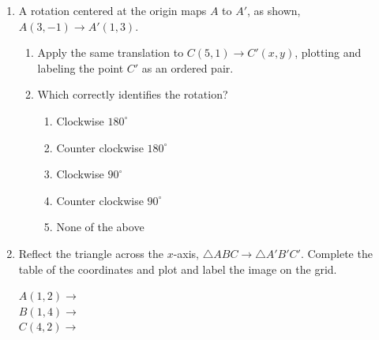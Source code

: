 \documentclass[12pt, twoside]{article}
\begin{document}
\begin{enumerate}
\newpage
\item A rotation centered at the origin maps $A$ to $A'$, as shown, $A(3,-1) \rightarrow A'(1,3)$.
\begin{multicols}{2}
  \begin{enumerate}
    \item Apply the same translation to $C(5,1)\rightarrow C'(x,y)$, plotting and labeling the point $C'$ as an ordered pair.
    \item Which correctly identifies the rotation?
    \begin{enumerate}[label=(\Alph*)]
      \item Clockwise $180^\circ$
      \item Counter clockwise $180^\circ$
      \item Clockwise $90^\circ$
      \item Counter clockwise $90^\circ$
      \item None of the above
    \end{enumerate} \vspace{2cm}
    \end{enumerate}
    \begin{flushright}
    \end{flushright}
\end{multicols}

\newpage
\item Reflect the triangle across the $x$-axis, $\triangle ABC \rightarrow \triangle A'B'C'$. Complete the table of the coordinates and plot and label the image on the grid. \vspace{0.5cm}
\begin{multicols}{2}
  $A(1,2) \rightarrow$ \\[0.7cm]
  $B(1,4) \rightarrow$ \\[0.7cm]
  $C(4,2) \rightarrow$ \\[0.7cm]
  \end{multicols}


\end{enumerate}
\end{document}
